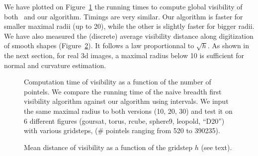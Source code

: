 
We have plotted on Figure~\ref{fig:meanvisibility-computationComplexity}
the running times to compute global visibility of both~\cite[Algorithm
  3]{lachaud:2022-jmiv} and our algorithm. Timings are very
similar. Our algorithm is faster for smaller maximal radii (up to 20),
while the other is slightly faster for bigger radii. We have also
measured the (discrete) average visibility distance along digitization
of smooth shapes (Figure~\ref{fig:meanvisibility-gridstep}). It follows
a law proportionnal to $\sqrt{h}$. As shown in the next section, for
real 3d images, a maximal radius below 10 is sufficient for normal and
curvature estimation.


\begin{figure}[t]
  \centering
  
  \caption{ \label{fig:meanvisibility-computationComplexity}Computation
    time of visibility as a function of the number of pointels. We
    compare the running time of the naive breadth first visibility
    algorithm against our algorithm using intervals. We input the same
    maximal radius to both versions (10, 20, 30) and test it on 6
    different figures (goursat, torus, rcube, sphere9, leopold,
    ``D20'') with various gridsteps, ($\#$ pointels ranging from 520
    to 390235).}
\end{figure}

\begin{figure}
  \centering
  
  \caption{\label{fig:meanvisibility-gridstep} Mean distance of visibility as a function of the gridstep $h$ (see text).}
\end{figure}
